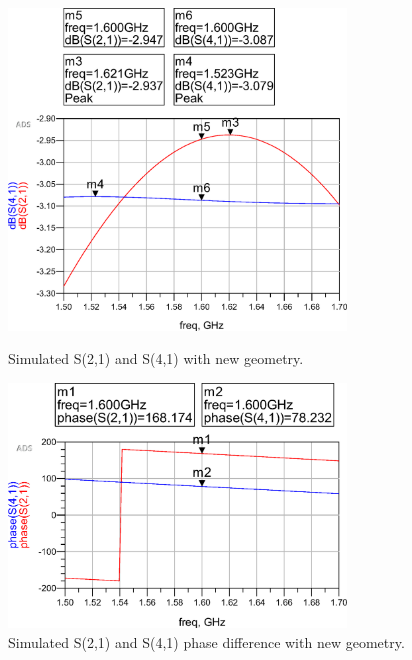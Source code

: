 \begin{figure}[h t b p]
	\centering
	\includegraphics[width=0.8\textwidth,keepaspectratio]{figures/big_sim_41_21.eps}
	\caption{Simulated S(2,1) and S(4,1) with new geometry.}
	\label{fig:big-sim-41-21}
%
	\includegraphics[width=0.8\textwidth,keepaspectratio]{figures/big_sim_phase.eps}
	\caption{Simulated S(2,1) and S(4,1) phase difference with new geometry.}
	\label{fig:big-sim-phase}
\end{figure}